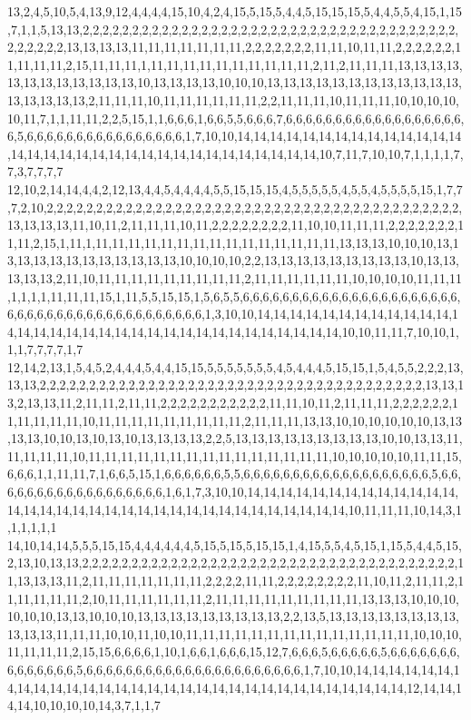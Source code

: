 13,2,4,5,10,5,4,13,9,12,4,4,4,4,15,10,4,2,4,15,5,15,5,4,4,5,15,15,15,5,4,4,5,5,4,15,1,15,7,1,1,5,13,13,2,2,2,2,2,2,2,2,2,2,2,2,2,2,2,2,2,2,2,2,2,2,2,2,2,2,2,2,2,2,2,2,2,2,2,2,2,2,2,2,2,2,2,2,13,13,13,13,11,11,11,11,11,11,11,2,2,2,2,2,2,2,11,11,10,11,11,2,2,2,2,2,2,11,11,11,11,2,15,11,11,11,1,11,11,11,11,11,11,11,11,11,11,2,11,2,11,11,11,13,13,13,13,13,13,13,13,13,13,13,13,10,13,13,13,13,10,10,10,13,13,13,13,13,13,13,13,13,13,13,13,13,13,13,13,13,2,11,11,11,10,11,11,11,11,11,11,2,2,11,11,11,10,11,11,11,10,10,10,10,10,11,7,1,1,11,11,2,2,5,15,1,1,6,6,6,1,6,6,5,5,6,6,6,7,6,6,6,6,6,6,6,6,6,6,6,6,6,6,6,6,6,6,6,5,6,6,6,6,6,6,6,6,6,6,6,6,6,6,6,6,1,7,10,10,14,14,14,14,14,14,14,14,14,14,14,14,14,14,14,14,14,14,14,14,14,14,14,14,14,14,14,14,14,14,14,14,14,10,7,11,7,10,10,7,1,1,1,1,7,7,3,7,7,7,7
12,10,2,14,14,4,4,2,12,13,4,4,5,4,4,4,4,5,5,15,15,15,4,5,5,5,5,5,4,5,5,4,5,5,5,5,15,1,7,7,7,2,10,2,2,2,2,2,2,2,2,2,2,2,2,2,2,2,2,2,2,2,2,2,2,2,2,2,2,2,2,2,2,2,2,2,2,2,2,2,2,2,2,2,2,13,13,13,13,11,10,11,2,11,11,11,10,11,2,2,2,2,2,2,2,2,11,10,10,11,11,11,2,2,2,2,2,2,2,11,11,2,15,1,11,1,11,11,11,11,11,11,11,11,11,11,11,11,11,11,11,13,13,13,10,10,10,13,13,13,13,13,13,13,13,13,13,13,13,10,10,10,10,2,2,13,13,13,13,13,13,13,13,13,10,13,13,13,13,13,2,11,10,11,11,11,11,11,11,11,11,11,2,11,11,11,11,11,11,10,10,10,10,11,11,11,1,1,1,1,11,11,11,15,1,11,5,5,15,15,1,5,6,5,5,6,6,6,6,6,6,6,6,6,6,6,6,6,6,6,6,6,6,6,6,6,6,6,6,6,6,6,6,6,6,6,6,6,6,6,6,6,6,6,6,6,6,1,3,10,10,14,14,14,14,14,14,14,14,14,14,14,14,14,14,14,14,14,14,14,14,14,14,14,14,14,14,14,14,14,14,14,14,14,10,10,11,11,7,10,10,1,1,1,7,7,7,7,1,7
12,14,2,13,1,5,4,5,2,4,4,4,5,4,4,15,15,5,5,5,5,5,5,5,4,5,4,4,4,5,15,15,1,5,4,5,5,2,2,2,13,13,13,2,2,2,2,2,2,2,2,2,2,2,2,2,2,2,2,2,2,2,2,2,2,2,2,2,2,2,2,2,2,2,2,2,2,2,2,2,2,2,13,13,13,2,13,13,11,2,11,11,2,11,11,2,2,2,2,2,2,2,2,2,2,2,11,11,10,11,2,11,11,11,2,2,2,2,2,2,11,11,11,11,11,10,11,11,11,11,11,11,11,11,11,2,11,11,11,13,13,10,10,10,10,10,10,13,13,13,13,10,10,13,10,13,10,13,13,13,13,2,2,5,13,13,13,13,13,13,13,13,13,10,10,13,13,11,11,11,11,11,10,11,11,11,11,11,11,11,11,11,11,11,11,11,11,11,10,10,10,10,10,11,11,15,6,6,6,1,1,11,11,7,1,6,6,5,15,1,6,6,6,6,6,6,5,5,6,6,6,6,6,6,6,6,6,6,6,6,6,6,6,6,6,6,6,5,6,6,6,6,6,6,6,6,6,6,6,6,6,6,6,6,6,6,1,6,1,7,3,10,10,14,14,14,14,14,14,14,14,14,14,14,14,14,14,14,14,14,14,14,14,14,14,14,14,14,14,14,14,14,14,14,14,14,14,10,11,11,11,10,14,3,1,1,1,1,1,1
14,10,14,14,5,5,5,15,15,4,4,4,4,4,4,5,15,5,15,5,15,15,1,4,15,5,5,4,5,15,1,15,5,4,4,5,15,2,13,10,13,13,2,2,2,2,2,2,2,2,2,2,2,2,2,2,2,2,2,2,2,2,2,2,2,2,2,2,2,2,2,2,2,2,2,2,2,2,2,2,11,13,13,13,11,2,11,11,11,11,11,11,11,2,2,2,2,11,11,2,2,2,2,2,2,2,2,11,10,11,2,11,11,2,11,11,11,11,11,2,10,11,11,11,11,11,11,2,11,11,11,11,11,11,11,11,11,13,13,13,10,10,10,10,10,10,13,13,10,10,10,13,13,13,13,13,13,13,13,13,2,2,13,5,13,13,13,13,13,13,13,13,13,13,13,11,11,11,10,10,11,10,10,11,11,11,11,11,11,11,11,11,11,11,11,11,11,10,10,10,11,11,11,11,2,15,15,6,6,6,6,1,10,1,6,6,1,6,6,6,15,12,7,6,6,6,5,6,6,6,6,6,5,6,6,6,6,6,6,6,6,6,6,6,6,6,6,5,6,6,6,6,6,6,6,6,6,6,6,6,6,6,6,6,6,6,6,6,6,6,1,7,10,10,14,14,14,14,14,14,14,14,14,14,14,14,14,14,14,14,14,14,14,14,14,14,14,14,14,14,14,14,14,14,14,12,14,14,14,14,10,10,10,10,14,3,7,1,1,7
